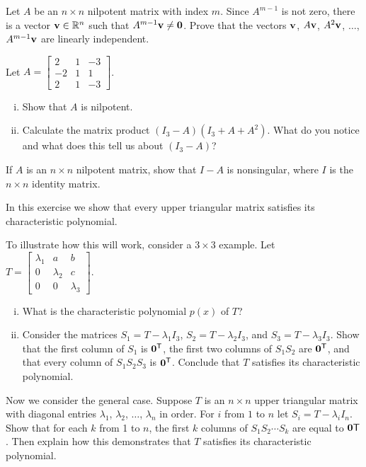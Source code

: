 \item Let $A$ be an $n \times n$ nilpotent matrix with index $m$. Since $A^{m-1}$ is not zero, there is a vector $\mathbf{v} \in \mathbb{R}^n$ such that $A^{m-1} \mathbf{v} \neq \mathbf{0}$. Prove that the vectors $\mathbf{v}$, $A\mathbf{v}$, $A^2\mathbf{v}$, $\ldots$, $A^{m-1}\mathbf{v}$ are linearly independent. 

\item 
\ba
\item Let $A = \left[ \begin{array}{rcr} 2&1&-3 \\ -2&1&1 \\ 2&1&-3 \end{array} \right]$. 
	\begin{enumerate}[i.]
	\item Show that $A$ is nilpotent.
	\item Calculate the matrix product $(I_3-A)\left(I_3+A+A^2\right)$. What do you notice and what does this tell us about $(I_3-A)$? 
	\end{enumerate}
\item If $A$ is an $n \times n$ nilpotent matrix, show that $I - A$ is nonsingular, where $I$ is the $n \times n$ identity matrix.

\ea

\item \label{ex:8_d_upper_triangular} In this exercise we show that every upper triangular matrix satisfies its characteristic polynomial. 
\ba
\item To illustrate how this will work, consider a $3 \times 3$ example. Let $T = \left[ \begin{array}{ccc} \lambda_1&a&b \\ 0&\lambda_2&c \\ 0&0& \lambda_3 \end{array} \right]$. 
	\begin{enumerate}[i.]
	\item What is the characteristic polynomial $p(x)$ of $T$?


	\item Consider the matrices $S_1 = T-\lambda_1 I_3$, $S_2 = T-\lambda_2 I_3$, and $S_3 = T-\lambda_3 I_3$. Show that the first column of $S_1$ is $\mathbf{0}^{\mathsf{T}}$, the first two columns of $S_1S_2$ are $\mathbf{0}^{\mathsf{T}}$, and that every column of $S_1S_2S_3$ is $\mathbf{0}^{\mathsf{T}}$. Conclude that $T$ satisfies its characteristic polynomial.

	\end{enumerate}

\item Now we consider the general case. Suppose $T$ is an $n \times n$ upper triangular matrix with diagonal entries $\lambda_1$, $\lambda_2$, $\ldots$, $\lambda_n$ in order. For $i$ from $1$ to $n$ let $S_i = T - \lambda_i I_n$. Show that for each $k$ from 1 to $n$, the first $k$ columns of $S_1S_2 \cdots S_k$ are equal to $\mathbf{0}{\mathsf{T}}$. Then explain how this demonstrates that $T$ satisfies its characteristic polynomial.

